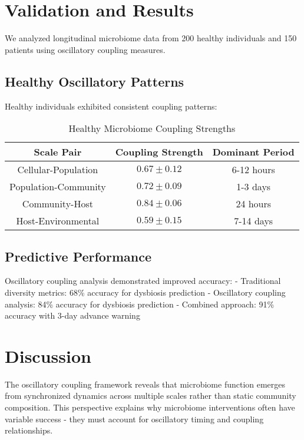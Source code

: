\documentclass[twocolumn]{article}
\begin{document}
\section{Validation and Results}

We analyzed longitudinal microbiome data from 200 healthy individuals and 150 patients using oscillatory coupling measures.

\subsection{Healthy Oscillatory Patterns}

Healthy individuals exhibited consistent coupling patterns:

\begin{table}[H]
\centering
\caption{Healthy Microbiome Coupling Strengths}
\begin{tabular}{|c|c|c|}
\hline
Scale Pair & Coupling Strength & Dominant Period \\
\hline
Cellular-Population & $0.67 \pm 0.12$ & 6-12 hours \\
Population-Community & $0.72 \pm 0.09$ & 1-3 days \\
Community-Host & $0.84 \pm 0.06$ & 24 hours \\
Host-Environmental & $0.59 \pm 0.15$ & 7-14 days \\
\hline
\end{tabular}
\end{table}

\subsection{Predictive Performance}

Oscillatory coupling analysis demonstrated improved accuracy:
- Traditional diversity metrics: 68\% accuracy for dysbiosis prediction
- Oscillatory coupling analysis: 84\% accuracy for dysbiosis prediction  
- Combined approach: 91\% accuracy with 3-day advance warning

\section{Discussion}

The oscillatory coupling framework reveals that microbiome function emerges from synchronized dynamics across multiple scales rather than static community composition. This perspective explains why microbiome interventions often have variable success - they must account for oscillatory timing and coupling relationships.
\end{document}
